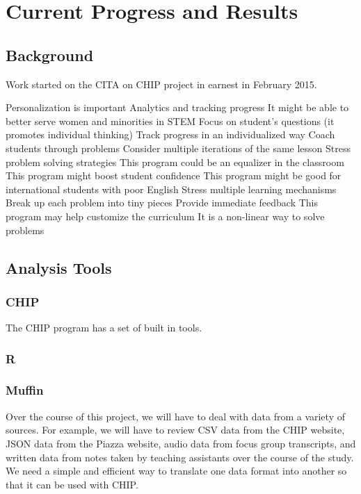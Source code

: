 \chapter[Chapter 4: Current Progress and Results]{Current Progress and Results}

\section{Background}

Work started on the CITA on CHIP project in earnest in February 2015.

Personalization is important
Analytics and tracking progress
It might be able to better serve women and minorities in STEM
Focus on student’s questions (it promotes individual thinking)
Track progress in an individualized way
Coach students through problems
Consider multiple iterations of the same lesson
Stress problem solving strategies
This program could be an equalizer in the classroom
This program might boost student confidence
This program might be good for international students with poor English
Stress multiple learning mechanisms
Break up each problem into tiny pieces
Provide immediate feedback
This program may help customize the curriculum
It is a non-linear way to solve problems

\section{Analysis Tools}

\subsection{CHIP}

The CHIP program has a set of built in tools.

\subsection{R}

\subsection{Muffin}

Over the course of this project, we will have to deal with data from a variety of sources. For example, we will have to review CSV data from the CHIP website, JSON data from the Piazza website, audio data from focus group transcripts, and written data from notes taken by teaching assistants over the course of the study. We need a simple and efficient way to translate one data format into another so that it can be used with CHIP.

